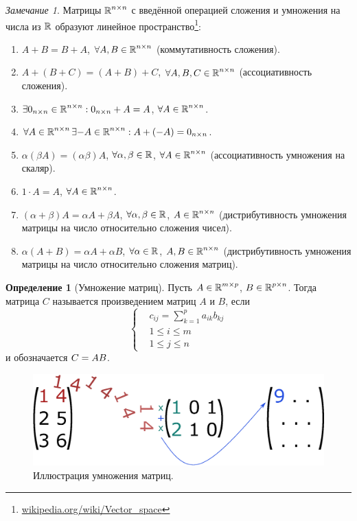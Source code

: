 \documentclass[a4paper,12pt]{article}
\theoremstyle{definition}
\newtheorem{definition}{Определение}[section]
\theoremstyle{remark}
\theoremstyle{remark}
\newtheorem*{remark}{Замечание}
\theoremstyle{remark}
\begin{document}
  \begin{remark}
    Матрицы $\operatorname{\mathbb R}^{n \times n}$ с введённой операцией сложения и умножения на числа из $\operatorname{\mathbb R}$ образуют линейное пространство\footnote{\href{https://en.wikipedia.org/wiki/Vector\_space}{wikipedia.org/wiki/Vector\_space}}:
    \begin{enumerate}
      \item $A + B = B + A$, $\forall A, B \in \operatorname{\mathbb R}^{n \times n}$ (коммутативность сложения).
      \item $A + (B + C) = (A + B) + C$, $\forall A, B, C \in \operatorname{\mathbb R}^{n \times n}$ (ассоциативность сложения).
      \item $\exists 0_{n\times n} \in \operatorname{\mathbb R}^{n \times n}: 0_{n\times n} + A = A$, $\forall A \hm\in \RR^{n \times n}$.
      \item $\forall A \in \operatorname{\mathbb R}^{n \times n} \exists {-A} \in \operatorname{\mathbb R}^{n \times n}: A + ({-A}) = 0_{n\times n}$.
      \item $\alpha (\beta A) = (\alpha \beta) A$, $\forall \alpha, \beta \in \operatorname{\mathbb R}$, $\forall A \hm\in \RR^{n \times n}$ (ассоциативность умножения на скаляр).
      \item $1 \cdot A = A$, $\forall A \in \operatorname{\mathbb R}^{n \times n}$.
      \item $(\alpha + \beta) A = \alpha A + \beta A$, $\forall \alpha, \beta \hm\in \RR$, $A \hm\in \RR^{n \times n}$ (дистрибутивность умножения матрицы на число относительно сложения чисел).
      \item $\alpha (A + B) = \alpha A + \alpha B$, $\forall \alpha \hm\in \RR$, $A, B \hm\in \RR^{n \times n}$ (дистрибутивность умножения матрицы на число относительно сложения матриц).
    \end{enumerate}
  \end{remark}
  
  \begin{definition}[Умножение матриц]
    Пусть $A \hm\in \RR^{m \times p}$, $B \hm\in \RR^{p \times n}$.
    Тогда матрица $C$ называется произведением матриц $A$ и $B$, если
    \[
      \left\{
        \begin{aligned}
          &c_{ij} = \sum_{k = 1}^p a_{ik} b_{kj}\\
          &1 \leq i \leq m\\
          &1 \leq j \leq n
        \end{aligned}
      \right.
    \]
    и обозначается $C \hm= AB$.
  \end{definition}

  \begin{figure}[h]
    \centering
    
    \includegraphics[width=0.5\columnwidth]{matrix-multiplication}
    
    \caption{Иллюстрация умножения матриц.}
    \label{fig:matrix-multiplication}
  \end{figure}
  
\end{document}
